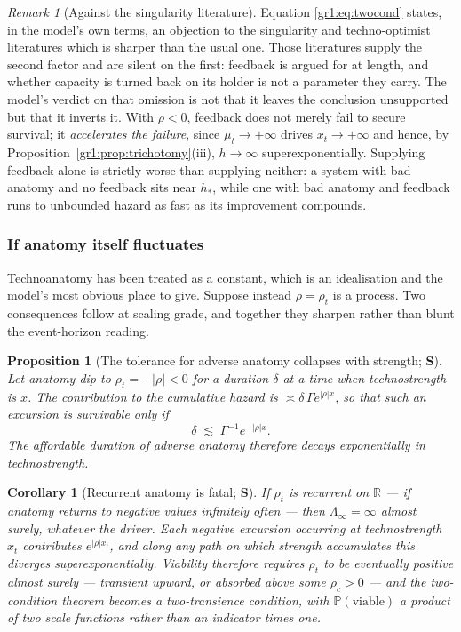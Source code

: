 \documentclass[11pt]{article}
\numberwithin{equation}{section}
\theoremstyle{plain}
\newtheorem{proposition}[theorem]{Proposition}
\newtheorem{corollary}[theorem]{Corollary}
\theoremstyle{definition}
\theoremstyle{remark}
\newtheorem{remark}[theorem]{Remark}
\newcommand{\PP}{\mathbb{P}}
\newcommand{\R}{\mathbb{R}}
\begin{document}
\begin{remark}[Against the singularity literature]
\label{gr1:rem:againstsing}
Equation \eqref{gr1:eq:twocond} states, in the model's own terms, an
objection to the singularity and techno-optimist literatures which is
sharper than the usual one. Those literatures supply
the second factor and are silent on the first: feedback is argued for at
length, and whether capacity is turned back on its holder is not a
parameter they carry. The model's verdict on that omission is not that
it leaves the conclusion unsupported but that it inverts it. With
$\rho<0$, feedback does not merely fail to secure survival; it
\emph{accelerates the failure}, since $\mu_t\to+\infty$ drives
$x_t\to+\infty$ and hence, by
Proposition~\ref{gr1:prop:trichotomy}(iii), $h\to\infty$
superexponentially. Supplying feedback alone is strictly worse than
supplying neither: a system with bad anatomy and no feedback sits near
$h_\ast$, while one with bad anatomy and feedback runs to unbounded
hazard as fast as its improvement compounds.
\end{remark}

\subsubsection{If anatomy itself fluctuates}\label{gr1:subsub:fluct}

Technoanatomy has been treated as a constant, which is an idealisation
and the model's most obvious place to give. Suppose instead
$\rho=\rho_t$ is a process. Two consequences follow at scaling grade,
and together they sharpen rather than blunt the event-horizon reading.

\begin{proposition}[The tolerance for adverse anatomy collapses with
strength; \textbf{S}]\label{gr1:prop:tolerance}
Let anatomy dip to $\rho_t=-|\rho|<0$ for a duration $\delta$ at a time
when technostrength is $x$. The contribution to the cumulative hazard
is $\asymp\delta\,\Gamma e^{|\rho|x}$, so that such an excursion is
survivable only if
\begin{equation}\label{gr1:eq:tolerance}
\delta\;\lesssim\;\Gamma^{-1}e^{-|\rho|x}.
\end{equation}
The affordable duration of adverse anatomy therefore decays
\emph{exponentially in technostrength}.
\end{proposition}

\begin{corollary}[Recurrent anatomy is fatal; \textbf{S}]
\label{gr1:cor:recurrentanatomy}
If $\rho_t$ is recurrent on $\R$ --- if anatomy returns to negative
values infinitely often --- then $\Lambda_\infty=\infty$ almost surely,
\emph{whatever the driver}. Each negative excursion occurring at
technostrength $x_t$ contributes $e^{|\rho|x_t}$, and along any path on
which strength accumulates this diverges superexponentially. Viability
therefore requires $\rho_t$ to be eventually positive almost surely ---
transient upward, or absorbed above some $\rho_c>0$ --- and the
two-condition theorem becomes a \emph{two-transience} condition, with
$\PP(\text{viable})$ a product of two scale functions rather than an
indicator times one.
\end{corollary}
\end{document}
